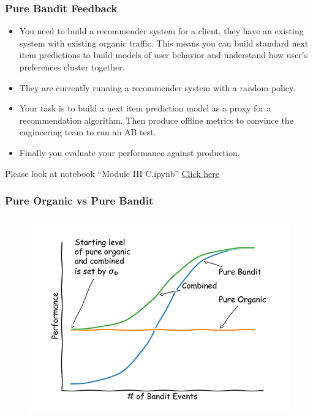 \begin{frame}
  \frametitle{Pure Bandit Feedback}

    \begin{itemize}
      \item You need to build a recommender system for a client, they have an existing system with existing organic traffic.  \pause This means you can build standard next item predictions to build models of user behavior and understand how user's preferences cluster together. \pause
      \item They are currently running a recommender system with a random policy. \pause
      \item Your task is to build a next item prediction model as a proxy for a recommendation algorithm.  Then produce offline metrics to convince the engineering team to run an AB test.\pause
      \item Finally you evaluate your performance against production.
    \end{itemize}

    \pause
    Please look at notebook ``Module III C.ipynb''
    \href{https://colab.research.google.com/github/criteo-research/reco-gym/blob/DS3/Module\%20III\%20C.ipynb}{Click here}

\end{frame}






\begin{frame}
  \frametitle{Pure Organic vs Pure Bandit}
\begin{figure}[h!]
\includegraphics[scale=0.45]{images/pureorganicpurebandit.png}
\centering
\end{figure}
\end{frame}






